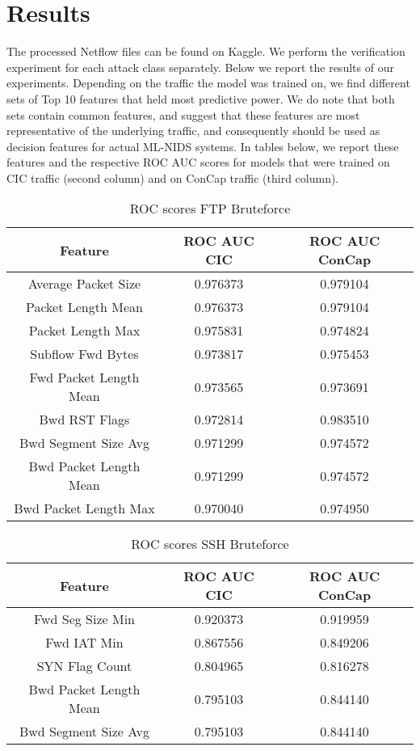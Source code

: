 \section{Results}
The processed Netflow files can be found on Kaggle. We perform the verification experiment for each attack class separately. Below we report the results of our experiments. Depending on the traffic the model was trained on, we find different sets of Top 10 features that held most predictive power. We do note that both sets contain common features, and suggest that these features are most representative of the underlying traffic, and consequently should be used as decision features for actual ML-NIDS systems. In tables below, we report these features and the respective ROC AUC scores for models that were trained on CIC traffic (second column) and on ConCap traffic (third column).

\begin{table}[h!]
	\begin{tabular}{ |c|c|c| }
		 \hline
		Feature & ROC AUC CIC & ROC AUC ConCap \\
		 \hline
		Average Packet Size & 0.976373 & 0.979104\\
		Packet Length Mean & 0.976373 & 0.979104\\
		Packet Length Max & 0.975831 & 0.974824\\
		Subflow Fwd Bytes & 0.973817 & 0.975453\\
		Fwd Packet Length Mean & 0.973565 & 0.973691\\
		Bwd RST Flags & 0.972814 & 0.983510\\
		Bwd Segment Size Avg & 0.971299 & 0.974572\\
		Bwd Packet Length Mean & 0.971299 & 0.974572\\
		Bwd Packet Length Max & 0.970040 & 0.974950\\
		 \hline
	\end{tabular}
	\caption{ROC scores FTP Bruteforce}
	\label{table:bruteforce_ftp}
\end{table}

\begin{table}[h!]
	\begin{tabular}{ |c|c|c| }
		\hline
		Feature & ROC AUC CIC & ROC AUC ConCap \\
		\hline
		Fwd Seg Size Min & 0.920373 & 0.919959\\
		Fwd IAT Min & 0.867556 & 0.849206\\
		SYN Flag Count & 0.804965 & 0.816278\\
		Bwd Packet Length Mean & 0.795103 & 0.844140\\
		Bwd Segment Size Avg & 0.795103 & 0.844140\\
		\hline
	\end{tabular}
	\caption{ROC scores SSH Bruteforce}
	\label{table:bruteforce_ssh}
\end{table}



